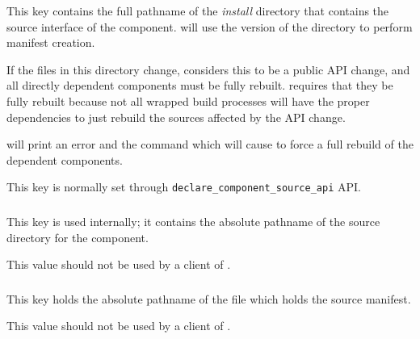 This key contains the full pathname of the \emph{install} directory
that contains the source interface of the component.  \lmsbw will use
the \destdir version of the directory to perform \mtree manifest
creation.

If the files in this directory change, \lmsbw considers this to be a
public API change, and all directly dependent components must be fully
rebuilt.  \lmsbw requires that they be fully rebuilt because not all
wrapped build processes will have the proper dependencies to just
rebuild the sources affected by the API change.

\lmsbw will print an error and the command which will cause \lmsbw to
force a full rebuild of the dependent components.

This key is normally set through
\texttt{declare\_component\_source\_api} API.


\subsubsection{}
This key is used internally; it contains the absolute pathname of the
source directory for the component.

This value should not be used by a client of \lmsbw.

\subsubsection{}

This key holds the absolute pathname of the file which holds the
source \mtree manifest.

This value should not be used by a client of \lmsbw.



